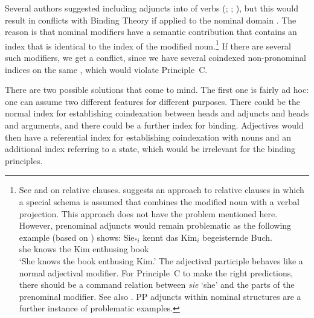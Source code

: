 \documentclass[output=paper,biblatex,babelshorthands,newtxmath,draftmode,colorlinks,citecolor=brown]{langscibook}
\begin{document}
Several authors suggested including adjuncts into \argstls of verbs
(\citealp[]{Chung98}; \citealp[]{Prze99}; \citealp*[]{MSI99a}), but this would
result in conflicts with Binding Theory if applied to the nominal domain \citep[Section~20.4.1]{Mueller99a}. The reason is that nominal modifiers have a semantic contribution that
contains an index that is identical to the index of the modified noun.\footnote{%
See  and
 on relative clauses. \citet{Sag97a} suggests an approach to relative clauses in
which a special schema is assumed that combines the modified noun with a verbal projection. This
approach does not have the problem mentioned here. However, prenominal adjuncts would remain
problematic as the following example (based on \citealt[]{Mueller99a}) shows:
\ea
\gll Sie$_{*i}$ kennt das Kim$_i$ begeisternde Buch.\\
     she        knows the Kim     enthusing    book\\
\glt `She knows the book enthusing Kim.'
\z
The adjectival participle behaves like a normal adjectival modifier. For Principle~C to make the
right predictions, there should be a command relation between \emph{sie} `she' and the parts of the
prenominal modifier. See also
\crossrefchapterw[\pageref{relative-clauses:fn-page-to-be-read}]{relative-clauses}. PP adjuncts
within nominal structures are a further instance of problematic examples.%
} If there are several such modifiers, we get a conflict, since we have several coindexed non-pronominal indices on the same
\argstl, which would violate Principle~C. 

There are two possible solutions that come to mind. The first one is fairly ad
hoc: one can assume two different features for different purposes. There could be the normal index
for establishing coindexation between heads and adjuncts and heads and arguments, and there could be
a further index for binding. Adjectives would then have a referential index for establishing
coindexation with nouns and an additional index referring to a state, which would be irrelevant for the
binding principles.
\end{document}
